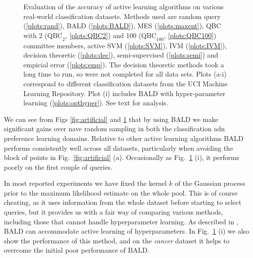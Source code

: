 \begin{figure}
	\begin{center}
	\begin{tabular}{ccc}
	\end{tabular}
	\end{center}
	\caption[Evaluation of Bayesian active learning on real-world data sets]{Evaluation of the accuracy of active learning algorithms on various real-world classification datasets. Methods used are random query (\ref{plots:rand}), BALD (\ref{plots:BALD}),  MES (\ref{plots:maxent}), QBC with 2 ($\mbox{QBC}_2$, \ref{plots:QBC2}) and 100 ($\mbox{QBC}_{100}$, \ref{plots:QBC100}) committee members, active SVM (\ref{plots:SVM}), IVM (\ref{plots:IVM}), decision theoretic \citep{Kapoor2007} (\ref{plots:dec}), semi-supervised \citep{Zhu2003} (\ref{plots:semi}) and empicial error (\ref{plots:emp}). The decision theoretic methods took a long time to run, so were not completed for all data sets. Plots (a-i) correspond to different classification datasets from the UCI Machine Learning Repository. Plot (i) includes BALD with hyper-parameter learning (\ref{plots:opthyper}). See text for analysis. \label{fig:BALD_GPC_results}}
\end{figure}

We can see from Figs \ref{fig:artificial} and \ref{fig:BALD_GPC_results} that by using BALD we make significant gains over nave random sampling in both the classification adn preference learning domains. Relative to other active learning algorithms BALD performs consistently well across all datasets, particularly when avoiding the block of points in Fig.\ \ref{fig:artificial} (a). Occasionally \eg as Fig.\ \ref{fig:BALD_GPC_results} (i), it performs poorly on the first couple of queries.

In most reported experiments we have fixed the kernel $k$ of the Gaussian process prior to the maximum likelihood estimate on the whole pool. This is of course cheating, as it uses information from the whole dataset before starting to select queries, but it provides us with a fair way of comparing various methods, including those that cannot handle hyperparameter learning. As described in \citep{Houlsby2011,Houlsby2012preference}, BALD can accommodate active learning of hyperparameters. In Fig.\ \ref{fig:BALD_GPC_results} (i) we also show the performance of this method, and on the \emph{cancer} dataset it helps to overcome the initial poor performance of BALD.


